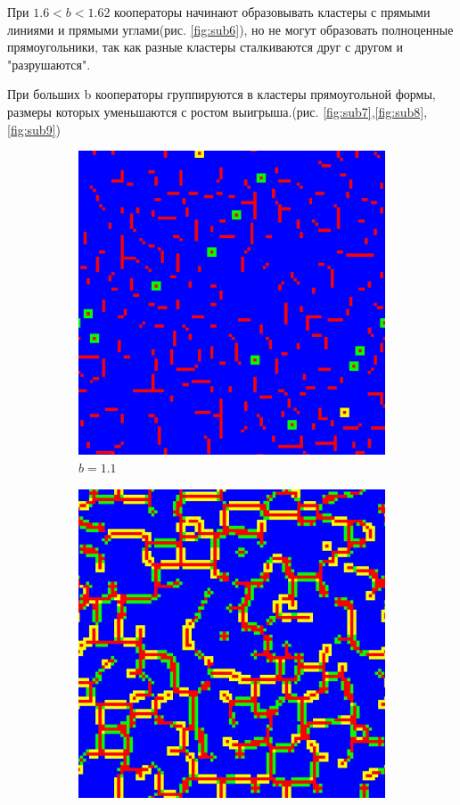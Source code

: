 \documentclass[12pt]{article}
\begin{document}
        При $1.6<b<1.62$ кооператоры начинают образовывать кластеры с прямыми линиями и прямыми углами(рис. \ref{fig:sub6}), но не могут образовать полноценные прямоугольники, так как разные кластеры сталкиваются друг с другом и "разрушаются".

        При больших b кооператоры группируются в кластеры прямоугольной формы, размеры которых уменьшаются с ростом выигрыша.(рис. \ref{fig:sub7},\ref{fig:sub8},\ref{fig:sub9})

        \begin{figure}[!htbp]
            \centering
            \captionsetup{justification=centering}
            \begin{subfigure}{.33\textwidth}
            \centering
            \includegraphics[width=.9\linewidth]{MeanFieldGame/snapshot_b=11.jpg}
            \caption{$b=1.1$}
            \label{fig:sub1}
            \end{subfigure}%
            \begin{subfigure}{.33\textwidth}
            \centering
            \includegraphics[width=.9\linewidth]{MeanFieldGame/snapshot_b=13.jpg}

\end{subfigure}
\end{figure}
\end{document}
